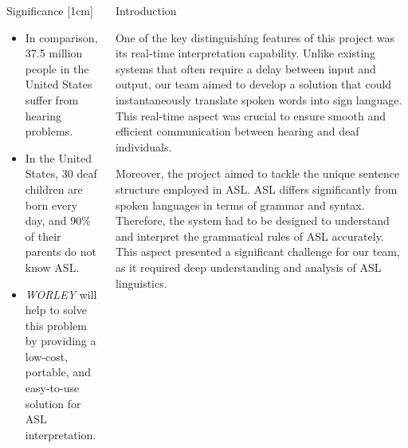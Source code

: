 \documentclass[final, 20pt]{beamer}
\newlength{\colwidth}
\newlength{\twocolwidth}
\begin{document}
\begin{frame}[t]
\begin{columns}[t]
\begin{column}{\colwidth}
\begin{block}{Significance}
        [1cm]

        \begin{itemize}
          \item In comparison, 37.5 million people in the United States suffer from hearing problems.

          \item In the United States, 30 deaf children are born every day, and 90\% of their parents do not know ASL.
          \item \emph{WORLEY} will help to solve this problem by providing a low-cost, portable, and easy-to-use solution for ASL interpretation.
        \end{itemize}
      \end{block}
    \end{column}

    \separatorcolumn

    \begin{column}{\twocolwidth}
      \begin{block}{Introduction}
        \begin{multicols}{2}


          One of the key distinguishing features of this project was its real-time interpretation capability. Unlike existing systems that often require a delay between input and output, our team aimed to develop a solution that could instantaneously translate spoken words into sign language. This real-time aspect was crucial to ensure smooth and efficient communication between hearing and deaf individuals.

          Moreover, the project aimed to tackle the unique sentence structure employed in ASL. ASL differs significantly from spoken languages in terms of grammar and syntax. Therefore, the system had to be designed to understand and interpret the grammatical rules of ASL accurately. This aspect presented a significant challenge for our team, as it required deep understanding and analysis of ASL linguistics.


\end{multicols}
\end{block}
\end{column}
\end{columns}
\end{frame}
\end{document}

